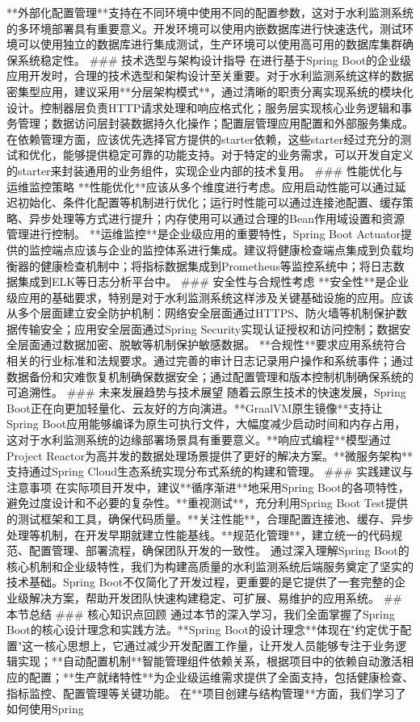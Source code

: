 **外部化配置管理**支持在不同环境中使用不同的配置参数，这对于水利监测系统的多环境部署具有重要意义。开发环境可以使用内嵌数据库进行快速迭代，测试环境可以使用独立的数据库进行集成测试，生产环境可以使用高可用的数据库集群确保系统稳定性。 ### 技术选型与架构设计指导 在进行基于Spring Boot的企业级应用开发时，合理的技术选型和架构设计至关重要。对于水利监测系统这样的数据密集型应用，建议采用**分层架构模式**，通过清晰的职责分离实现系统的模块化设计。控制器层负责HTTP请求处理和响应格式化；服务层实现核心业务逻辑和事务管理；数据访问层封装数据持久化操作；配置层管理应用配置和外部服务集成。 在依赖管理方面，应该优先选择官方提供的starter依赖，这些starter经过充分的测试和优化，能够提供稳定可靠的功能支持。对于特定的业务需求，可以开发自定义的starter来封装通用的业务组件，实现企业内部的技术复用。 ### 性能优化与运维监控策略 **性能优化**应该从多个维度进行考虑。应用启动性能可以通过延迟初始化、条件化配置等机制进行优化；运行时性能可以通过连接池配置、缓存策略、异步处理等方式进行提升；内存使用可以通过合理的Bean作用域设置和资源管理进行控制。 **运维监控**是企业级应用的重要特性，Spring Boot Actuator提供的监控端点应该与企业的监控体系进行集成。建议将健康检查端点集成到负载均衡器的健康检查机制中；将指标数据集成到Prometheus等监控系统中；将日志数据集成到ELK等日志分析平台中。 ### 安全性与合规性考虑 **安全性**是企业级应用的基础要求，特别是对于水利监测系统这样涉及关键基础设施的应用。应该从多个层面建立安全防护机制：网络安全层面通过HTTPS、防火墙等机制保护数据传输安全；应用安全层面通过Spring Security实现认证授权和访问控制；数据安全层面通过数据加密、脱敏等机制保护敏感数据。 **合规性**要求应用系统符合相关的行业标准和法规要求。通过完善的审计日志记录用户操作和系统事件；通过数据备份和灾难恢复机制确保数据安全；通过配置管理和版本控制机制确保系统的可追溯性。 ### 未来发展趋势与技术展望 随着云原生技术的快速发展，Spring Boot正在向更加轻量化、云友好的方向演进。**GraalVM原生镜像**支持让Spring Boot应用能够编译为原生可执行文件，大幅度减少启动时间和内存占用，这对于水利监测系统的边缘部署场景具有重要意义。**响应式编程**模型通过Project Reactor为高并发的数据处理场景提供了更好的解决方案。**微服务架构**支持通过Spring Cloud生态系统实现分布式系统的构建和管理。 ### 实践建议与注意事项 在实际项目开发中，建议**循序渐进**地采用Spring Boot的各项特性，避免过度设计和不必要的复杂性。**重视测试**，充分利用Spring Boot Test提供的测试框架和工具，确保代码质量。**关注性能**，合理配置连接池、缓存、异步处理等机制，在开发早期就建立性能基线。**规范化管理**，建立统一的代码规范、配置管理、部署流程，确保团队开发的一致性。 通过深入理解Spring Boot的核心机制和企业级特性，我们为构建高质量的水利监测系统后端服务奠定了坚实的技术基础。Spring Boot不仅简化了开发过程，更重要的是它提供了一套完整的企业级解决方案，帮助开发团队快速构建稳定、可扩展、易维护的应用系统。 ## 本节总结 ### 核心知识点回顾 通过本节的深入学习，我们全面掌握了Spring Boot的核心设计理念和实践方法。**Spring Boot的设计理念**体现在"约定优于配置"这一核心思想上，它通过减少开发配置工作量，让开发人员能够专注于业务逻辑实现；**自动配置机制**智能管理组件依赖关系，根据项目中的依赖自动激活相应的配置；**生产就绪特性**为企业级运维需求提供了全面支持，包括健康检查、指标监控、配置管理等关键功能。 在**项目创建与结构管理**方面，我们学习了如何使用Spring 